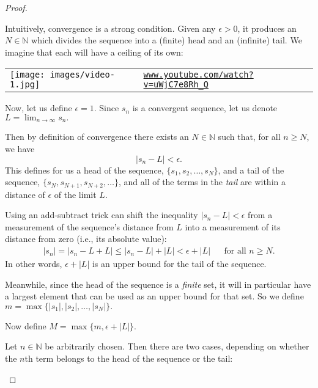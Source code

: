 \documentclass[10pt,]{article}
\theoremstyle{plain}
\theoremstyle{definition}
\numberwithin{equation}{section}
\newcommand{\lt}{<}
\newcommand{\amp}{&}
\begin{document}
\begin{proof}\hypertarget{proof-1}{}
\hypertarget{p-6}{}%
Intuitively, convergence is a strong condition. Given any \(\epsilon>0\), it produces an \(N\in\mathbb{N}\) which divides the sequence into a (finite) head and an (infinite) tail. We imagine that each will have a ceiling of its own:%
\begin{tabular}{m{.2\linewidth}m{.6\linewidth}}
\texttt{[image: images/video-1.jpg]}&%
\href{https://www.youtube.com/watch?v=uWjC7e8Rh_Q}{\texttt{\nolinkurl{www.youtube.com/watch?v=uWjC7e8Rh_Q}}}
\end{tabular}
\hypertarget{p-7}{}%
Now, let us define \(\epsilon = 1\). Since \(s_n\) is a convergent sequence, let us denote \(L = \lim_{n\to\infty} s_n.\)%
\par
\hypertarget{p-8}{}%
Then by definition of convergence there exists an \(N\in\mathbb{N}\) such that, for all \(n \geq N\), we have%
\begin{equation*}
|s_n - L| \lt \epsilon.
\end{equation*}
This defines for us a head of the sequence, \(\{s_1,s_2,\ldots,s_N\}\), and a tail of the sequence, \(\{s_N,s_{N+1},s_{N+2},\ldots\}\), and all of the terms in the \emph{tail} are within a distance of \(\epsilon\) of the limit \(L\).%
\par
\hypertarget{p-9}{}%
Using an add-subtract trick can shift the inequality \(|s_n-L|\lt\epsilon\) from a measurement of the sequence's distance from \(L\) into a measurement of its distance from zero (i.e., its absolute value):%
\begin{align}
|s_n|  = |s_n - L + L| \leq |s_n-L| + |L|  \lt \epsilon + |L| \amp\amp \text{for all } n \geq N. \label{tail-ineq}
\end{align}
In other words, \(\epsilon+|L|\) is an upper bound for the tail of the sequence.%
\par
\hypertarget{p-10}{}%
Meanwhile, since the head of the sequence is a \emph{finite} set, it will in particular have a largest element that can be used as an upper bound for that set. So we define \(m = \max \{ |s_1|, |s_2|, \ldots, |s_N| \}.\)%
\par
\hypertarget{p-11}{}%
Now define \(M = \max\{ m , \epsilon+|L|\}.\)%
\par
\hypertarget{p-12}{}%
Let \(n\in\mathbb{N}\) be arbitrarily chosen. Then there are two cases, depending on whether the \(n\)th term belongs to the head of the sequence or the tail:%
\leavevmode%
\begin{enumerate}

\end{enumerate}
\end{proof}
\end{document}
